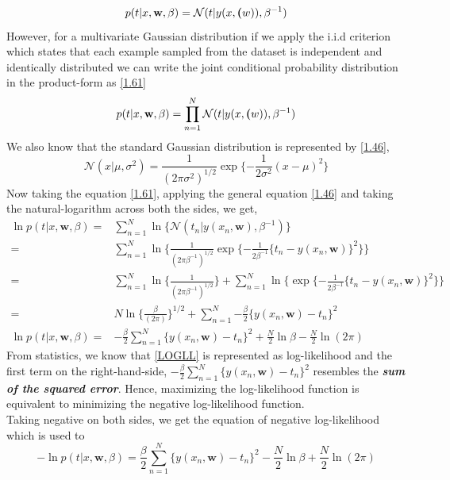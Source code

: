 \documentclass[12pt,twoside,a4paper]{article}
\begin{document}
\begin{equation}\label{1.60}
    p(t|x,\textbf{w}, \beta) = \mathcal{N}(t|y(x,\textbf(w)),\beta^{-1})
\end{equation}
However, for a multivariate Gaussian distribution if we apply the i.i.d criterion which states that each example sampled from the dataset is independent and identically distributed we can write the joint conditional probability distribution in the product-form as \eqref{1.61}
\begin{equation}\label{1.61}
    p(t|x,\textbf{w}, \beta) = \prod_{n=1}^{N}\mathcal{N}(t|y(x,\textbf(w)),\beta^{-1})
\end{equation}
We also know that the standard Gaussian distribution is represented by \eqref{1.46},
\begin{equation} \label{1.46}
    \mathcal{N}(x|\mu,\sigma^2) = \frac{1}{(2\pi\sigma^2)^{1/2}}\exp\{-\frac{1}{2\sigma^2}(x-\mu)^2\}
\end{equation}
Now taking the equation \eqref{1.61}, applying the general equation \eqref{1.46} and taking the natural-logarithm across both the sides, we get,
\begin{align} \label{1.62}
\ln p(t|x,\textbf{w}, \beta) =& \sum_{n=1}^{N} \ln \{ \mathcal{N}(t_n|y(x_n,\textbf{w}),\beta^{-1}) \} \\
=& \sum_{n=1}^{N} \ln \{ \frac{1}{(2\pi\beta^{-1})^{1/2}}\exp\{-\frac{1}{2\beta^{-1}}\{t_n-y(x_n,\textbf{w})\}^2\}\} \\
=&\sum_{n=1}^{N} \ln \{ \frac{1}{(2\pi\beta^{-1})^{1/2}} \} + \sum_{n=1}^{N} \ln \{\exp\{-\frac{1}{2\beta^{-1}}\{t_n-y(x_n,\textbf{w})\}^2\}\} \\
=& N\ln \{ \frac{\beta}{(2\pi)} \}^{1/2} + \sum_{n=1}^{N} {-\frac{\beta}{2}\{y(x_n,\textbf{w})-t_n\}^2} \\
\ln p(t|x,\textbf{w}, \beta) =& -\frac{\beta}{2}\sum_{n=1}^{N} {\{y(x_n,\textbf{w})-t_n\}^2} + \frac{N}{2}\ln\beta - \frac{N}{2}\ln(2\pi) \label{LOGLL}
\end{align}
From statistics, we know that \eqref{LOGLL} is represented as log-likelihood and the first term on the right-hand-side, $-\frac{\beta}{2}\sum_{n=1}^{N} {\{y(x_n,\textbf{w})-t_n\}^2}$ resembles the \textit{\textbf{sum of the squared error}}. Hence, maximizing the log-likelihood function is equivalent to minimizing the negative log-likelihood function. \\
Taking negative on both sides, we get the equation of negative log-likelihood which is used to 
\begin{equation} \label{NLL}
    -\ln p(t|x,\textbf{w}, \beta) = \frac{\beta}{2}\sum_{n=1}^{N} {\{y(x_n,\textbf{w})-t_n\}^2} - \frac{N}{2}\ln\beta + \frac{N}{2}\ln(2\pi)
\end{equation}
\end{document}
